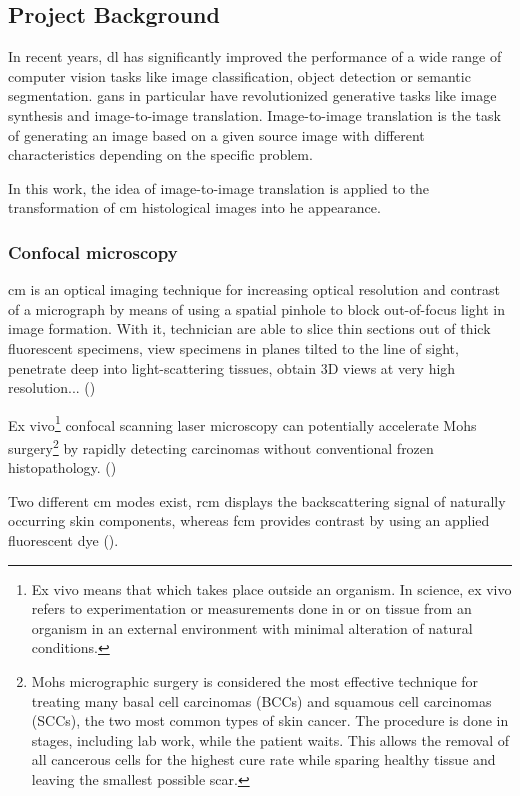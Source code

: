 \documentclass[../main.tex]{subfiles}
\begin{document}
\subsection{Project Background}
\label{sec:project-background}

In recent years, \gls{dl} has significantly improved the
performance of a wide range of computer vision tasks like image classification,
object detection or semantic segmentation.
\gls{gans} in particular have revolutionized generative tasks like image synthesis
and image-to-image translation.
Image-to-image translation is the task of generating an image based on a
given source image with different characteristics depending on the specific problem.

In this work, the idea of image-to-image translation is applied
to the transformation of \gls{cm} histological images into \gls{he} appearance.

\subsubsection{Confocal microscopy}
\gls{cm} is an optical imaging technique for increasing optical resolution
and contrast of a micrograph by means of using a spatial pinhole to block
out-of-focus light in image formation. With it, technician are able to slice
thin sections out of thick fluorescent specimens, view specimens
in planes tilted to the line of sight, penetrate deep into light-scattering
tissues, obtain 3D views at very high resolution... (\cite{Inoue2006})

Ex vivo\footnote{Ex vivo means that which takes place outside an organism.
In science, ex vivo refers to experimentation or measurements done in or on
tissue from an organism in an external environment with minimal alteration
of natural conditions.} confocal scanning laser microscopy can potentially
accelerate Mohs surgery\footnote{Mohs micrographic surgery is considered the
most effective technique for treating many basal cell carcinomas (BCCs) and
squamous cell carcinomas (SCCs), the two most common types of skin cancer.
The procedure is done in stages, including lab work, while the patient waits.
This allows the removal of all cancerous cells for the highest cure rate
while sparing healthy tissue and leaving the smallest possible scar.}
by rapidly detecting carcinomas without conventional frozen histopathology.
(\cite{Chung2005})

Two different \gls{cm} modes exist, \gls{rcm} displays the backscattering signal
of naturally occurring skin components, whereas \gls{fcm} provides contrast
by using an applied fluorescent dye (\cite{Skvara2012}).
\end{document}
